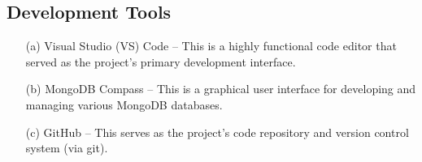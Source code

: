 \subsection{Development Tools}
\label{subsec:dev_tools}
\begin{itemize}
    \item[(a)] Visual Studio (VS) Code – This is a highly functional 
    code editor that served as the project's primary development 
    interface.
    \item[(b)]MongoDB Compass – This is a graphical user interface 
    for developing and managing various MongoDB databases.
    \item[(c)] GitHub – This serves as the project's code 
    repository and version control system (via git).
\end{itemize}